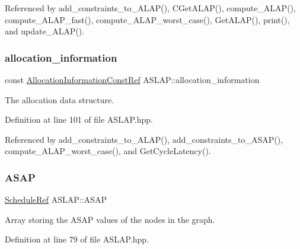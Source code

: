 Referenced by add\+\_\+constraints\+\_\+to\+\_\+\+A\+L\+A\+P(), C\+Get\+A\+L\+A\+P(), compute\+\_\+\+A\+L\+A\+P(), compute\+\_\+\+A\+L\+A\+P\+\_\+fast(), compute\+\_\+\+A\+L\+A\+P\+\_\+worst\+\_\+case(), Get\+A\+L\+A\+P(), print(), and update\+\_\+\+A\+L\+A\+P().

\mbox{\label{classASLAP_a248a492b911d55531c0ff0dec1d31c0a}} 
\subsubsection{\texorpdfstring{allocation\+\_\+information}{allocation\_information}}
{\footnotesize\ttfamily const \hyperlink{allocation__information_8hpp_a54287618a63bf87e31ddb17ba01e7ca7}{Allocation\+Information\+Const\+Ref} A\+S\+L\+A\+P\+::allocation\+\_\+information\hspace{0.3cm}{\ttfamily [private]}}



The allocation data structure. 



Definition at line 101 of file A\+S\+L\+A\+P.\+hpp.



Referenced by add\+\_\+constraints\+\_\+to\+\_\+\+A\+L\+A\+P(), add\+\_\+constraints\+\_\+to\+\_\+\+A\+S\+A\+P(), compute\+\_\+\+A\+L\+A\+P\+\_\+worst\+\_\+case(), and Get\+Cycle\+Latency().

\mbox{\label{classASLAP_a990a50136c419bedeb405a1d54b859d3}} 
\subsubsection{\texorpdfstring{A\+S\+AP}{ASAP}}
{\footnotesize\ttfamily \hyperlink{schedule_8hpp_af67f402958b3b52a1ec5cc4ce08ae3b9}{Schedule\+Ref} A\+S\+L\+A\+P\+::\+A\+S\+AP\hspace{0.3cm}{\ttfamily [private]}}



Array storing the A\+S\+AP values of the nodes in the graph. 



Definition at line 79 of file A\+S\+L\+A\+P.\+hpp.



